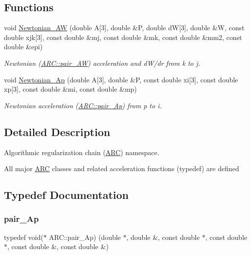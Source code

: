 \subsection*{Functions}
\begin{DoxyCompactItemize}
\item 
void \hyperlink{namespaceARC_a3c3f20df43ba5df3e21857643130d784}{Newtonian\+\_\+\+AW} (double A\mbox{[}3\mbox{]}, double \&P, double dW\mbox{[}3\mbox{]}, double \&W, const double xjk\mbox{[}3\mbox{]}, const double \&mj, const double \&mk, const double \&mm2, const double \&epi)
\begin{DoxyCompactList}\small\item\em Newtonian (\hyperlink{namespaceARC_adbfc7c72ce3d25363148027db0641abf}{A\+R\+C\+::pair\+\_\+\+AW}) acceleration and d\+W/dr from k to j. \end{DoxyCompactList}\item 
void \hyperlink{namespaceARC_a6b8ee871e0832b6b59968ea9069877e0}{Newtonian\+\_\+\+Ap} (double A\mbox{[}3\mbox{]}, double \&P, const double xi\mbox{[}3\mbox{]}, const double xp\mbox{[}3\mbox{]}, const double \&mi, const double \&mp)
\begin{DoxyCompactList}\small\item\em Newtonian acceleration (\hyperlink{namespaceARC_a819446c4644b3a3af7ef11574d0b55e0}{A\+R\+C\+::pair\+\_\+\+Ap}) from p to i. \end{DoxyCompactList}\end{DoxyCompactItemize}


\subsection{Detailed Description}
Algorithmic regularization chain (\hyperlink{namespaceARC}{A\+RC}) namespace. 

All major \hyperlink{namespaceARC}{A\+RC} classes and related acceleration functions (typedef) are defined 

\subsection{Typedef Documentation}
\hypertarget{namespaceARC_a819446c4644b3a3af7ef11574d0b55e0}{}\label{namespaceARC_a819446c4644b3a3af7ef11574d0b55e0} 
\subsubsection{\texorpdfstring{pair\+\_\+\+Ap}{pair\_Ap}}
{\footnotesize\ttfamily typedef void($\ast$ A\+R\+C\+::pair\+\_\+\+Ap) (double $\ast$, double \&, const double $\ast$, const double $\ast$, const double \&, const double \&)}



